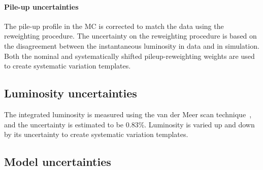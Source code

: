 \paragraph*{Pile-up uncertainties}
The pile-up profile in the MC is corrected to match the data using the reweighting procedure. The uncertainty on the reweighting procedure is based on the disagreement between the instantaneous luminosity in data and in simulation. Both the nominal and systematically shifted pileup-reweighting weights are used to create systematic variation templates.


\subsection*{Luminosity uncertainties}
The integrated luminosity is measured using the van der Meer scan technique~\cite{ATLAS:2022hro}, and the uncertainty is estimated to be 0.83\%. Luminosity is varied up and down by its uncertainty to create systematic variation templates.


\subsection{Model uncertainties}
\label{sec:theoretical_uncertainties}


